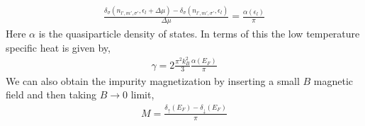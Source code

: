 \documentclass[aps,prx,preprint,groupedaddress]{revtex4-2}
\begin{document}
\begin{eqnarray}
\frac{\delta_{\sigma}(n_{l',m',\sigma'},\epsilon_{l}+\Delta\mu)-\delta_{\sigma}(n_{l',m',\sigma'},\epsilon_{l})}{\Delta\mu}=\frac{\alpha(\epsilon_{l})}{\pi}
\end{eqnarray}
Here $\alpha$ is the quasiparticle density of states. In terms of this the low temperature specific heat is given by,
\begin{eqnarray}
\gamma = 2\frac{\pi^{2}k_{B}^{2}}{3}\frac{\alpha(E_{F})}{\pi}
\end{eqnarray} 
We can also obtain the impurity magnetization by inserting a small $B$ magnetic field and then taking $B\to 0$ limit,
\begin{eqnarray}
M=\frac{\delta_{\uparrow}(E_{F})-\delta_{\downarrow}(E_{F})}{\pi}
\end{eqnarray}

%
\end{document}
